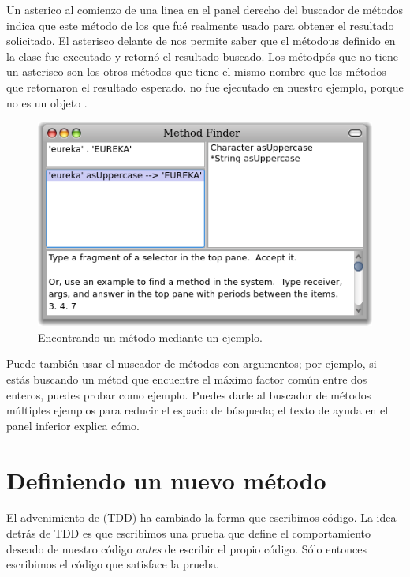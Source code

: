 \documentclass[a4paper,10pt,twoside]{book}
\begin{document}
Un asterico al comienzo de una linea en el panel derecho del buscador de m\'etodos indica que este m\'etodo de los que fu\'e realmente usado para obtener el resultado solicitado. 
El asterisco delante de  nos permite saber que el m\'etodous  definido en la clase  fue executado y retorn\'o el resultado buscado. Los m\'etodp\'os que no tiene un asterisco son los otros m\'etodos que tiene el mismo nombre que los m\'etodos que retornaron el resultado esperado.  no fue ejecutado en nuestro ejemplo, porque  no es un objeto .

\begin{figure}[hbt]
\centerline {\includegraphics[width=\textwidth]{MethodFinder-example1}}
\caption{Encontrando un m\'etodo mediante un ejemplo.
}
\end{figure}

Puede tambi\'en usar el nuscador de m\'etodos con argumentos; por ejemplo, si est\'as buscando un m\'etod que encuentre el m\'aximo factor com\'un entre dos enteros, puedes probar  como ejemplo. Puedes darle al buscador de m\'etodos m\'ultiples ejemplos para reducir el espacio de b\'usqueda; el texto de ayuda en el panel inferior explica c\'omo.

\section{Definiendo un nuevo m\'etodo}

El advenimiento de \cite{Beck03a} (TDD) ha cambiado la forma que escribimos c\'odigo.
La idea detr\'as de TDD es que escribimos una prueba que define el comportamiento deseado de nuestro c\'odigo \emph{antes} de escribir el propio c\'odigo.
S\'olo entonces escribimos el c\'odigo que satisface la prueba.
\end{document}
